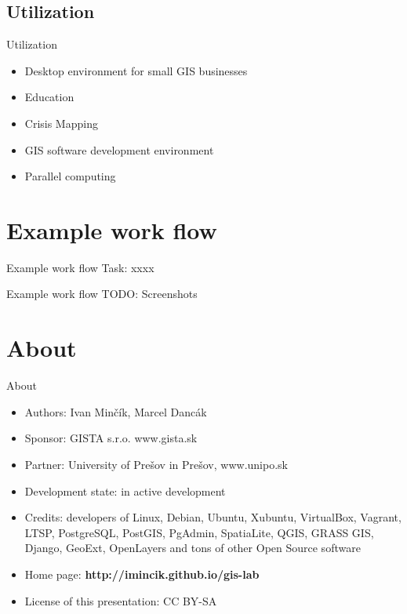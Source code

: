 \documentclass[12pt]{beamer}
\begin{document}
\subsection{Utilization}
\begin{frame}{Utilization}
	\begin{itemize}
		\item Desktop environment for small GIS businesses
		\item Education
		\item Crisis Mapping
		\item GIS software development environment
		\item Parallel computing
	\end{itemize}
\end{frame}


\section{Example work flow}
\begin{frame}{Example work flow}
	Task: xxxx
\end{frame}


\begin{frame}{Example work flow}
	TODO: Screenshots
\end{frame}


\section{About}
\begin{frame}{About}
	\begin{itemize}
		\item Authors: Ivan Minčík, Marcel Dancák
		\item Sponsor: GISTA s.r.o. www.gista.sk
		\item Partner: University of Prešov in Prešov, www.unipo.sk
		\item Development state: in active development
		\item Credits: developers of Linux, Debian, Ubuntu, Xubuntu, VirtualBox, Vagrant, LTSP, PostgreSQL, PostGIS, PgAdmin, SpatiaLite, QGIS, GRASS GIS, Django, GeoExt, OpenLayers and tons of other Open Source software
		\item Home page: \textbf{http://imincik.github.io/gis-lab}
		\item License of this presentation: CC BY-SA
	\end{itemize}
\end{frame}
\end{document}
